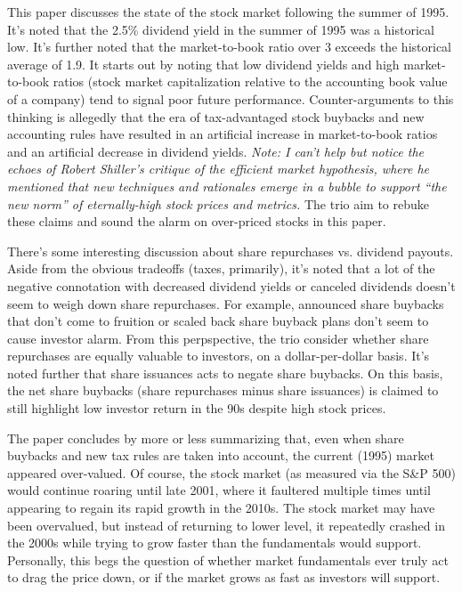 This paper discusses the state of the stock market following the summer of 1995.  It's noted that the 2.5\% dividend yield in the summer of 1995 was a historical low.  It's further noted that the market-to-book ratio over 3 exceeds the historical average of 1.9.  It starts out by noting that low dividend yields and high market-to-book ratios (stock market capitalization relative to the accounting book value of a company) tend to signal poor future performance.  Counter-arguments to this thinking is allegedly that the era of tax-advantaged stock buybacks and new accounting rules have resulted in an artificial increase in market-to-book ratios and an artificial decrease in dividend yields.  {\it Note: I can't help but notice the echoes of Robert Shiller's critique of the efficient market hypothesis, where he mentioned that new techniques and rationales emerge in a bubble to support ``the new norm'' of eternally-high stock prices and metrics.}  The trio aim to rebuke these claims and sound the alarm on over-priced stocks in this paper.

There's some interesting discussion about share repurchases vs. dividend payouts.  Aside from the obvious tradeoffs (taxes, primarily), it's noted that a lot of the negative connotation with decreased dividend yields or canceled dividends doesn't seem to weigh down share repurchases.  For example, announced share buybacks that don't come to fruition or scaled back share buyback plans don't seem to cause investor alarm.  From this perpspective, the trio consider whether share repurchases are equally valuable to investors, on a dollar-per-dollar basis.  It's noted further that share issuances acts to negate share buybacks.  On this basis, the net share buybacks (share repurchases minus share issuances) is claimed to still highlight low investor return in the 90s despite high stock prices.

The paper concludes by more or less summarizing that, even when share buybacks and new tax rules are taken into account, the current (1995) market appeared over-valued.  Of course, the stock market (as measured via the S\&P 500) would continue roaring until late 2001, where it faultered multiple times until appearing to regain its rapid growth in the 2010s.  The stock market may have been overvalued, but instead of returning to lower level, it repeatedly crashed in the 2000s while trying to grow faster than the fundamentals would support.  Personally, this begs the question of whether market fundamentals ever truly act to drag the price down, or if the market grows as fast as investors will support.

